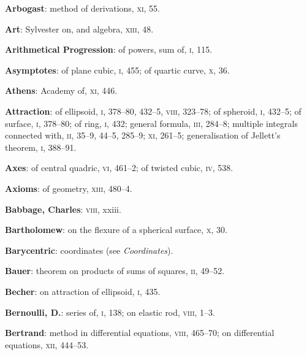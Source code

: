 \documentclass[11pt,a4paper]{book}
\begin{document}
\vspace{0.4em}
\textbf{Arbogast}: method of derivations, \textsc{xi}, 55.

\vspace{0.4em}
\textbf{Art}: Sylvester on, and algebra, \textsc{xiii}, 48.

\vspace{0.4em}
\textbf{Arithmetical Progression}: of powers, sum of, \textsc{i}, 115.

\vspace{0.4em}
\textbf{Asymptotes}: of plane cubic, \textsc{i}, 455; of quartic curve, \textsc{x}, 36.

\vspace{0.4em}
\textbf{Athens}: Academy of, \textsc{xi}, 446.

\vspace{0.4em}
\textbf{Attraction}: of ellipsoid, \textsc{i}, 378--80, 432--5, \textsc{viii}, 323--78; of spheroid, \textsc{i}, 432--5; of surface, \textsc{i}, 378--80; of ring, \textsc{i}, 432; general formula, \textsc{iii}, 284--8; multiple integrals connected with, \textsc{ii}, 35--9, 44--5, 285--9; \textsc{xi}, 261--5; generalisation of Jellett's theorem, \textsc{i}, 388--91.

\vspace{0.4em}
\textbf{Axes}: of central quadric, \textsc{vi}, 461--2; of twisted cubic, \textsc{iv}, 538.

\vspace{0.4em}
\textbf{Axioms}: of geometry, \textsc{xiii}, 480--4.

\vspace{0.4em}
\textbf{Babbage, Charles}: \textsc{viii}, xxiii.

\vspace{0.4em}
\textbf{Bartholomew}: on the flexure of a spherical surface, \textsc{x}, 30.

\vspace{0.4em}
\textbf{Barycentric}: coordinates (see \textit{Coordinates}).

\vspace{0.4em}
\textbf{Bauer}: theorem on products of sums of squares, \textsc{ii}, 49--52.

\vspace{0.4em}
\textbf{Becher}: on attraction of ellipsoid, \textsc{i}, 435.

\vspace{0.4em}
\textbf{Bernoulli, D.}: series of, \textsc{i}, 138; on elastic rod, \textsc{viii}, 1--3.

\vspace{0.4em}
\textbf{Bertrand}: method in differential equations, \textsc{viii}, 465--70; on differential equations, \textsc{xii}, 444--53.
\end{document}
